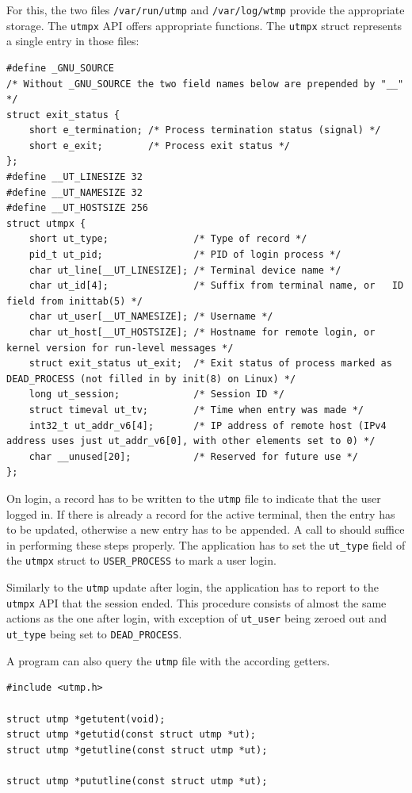 \documentclass[10pt,a4paper,titlepage,twoside,english,final]{zhawreprt}
\begin{document}
For this, the two files \texttt{/var/run/utmp} and \texttt{/var/log/wtmp} provide the appropriate storage. The \texttt{utmpx} \gls{API} offers appropriate functions. The \texttt{utmpx} struct represents a single entry in those files:
\setlistingC
\begin{lstlisting}[caption={Definition of the utmpx structure {\citep[p.819]{KerriskTLPI}}},label=lst:UtmpxDefinition]
#define _GNU_SOURCE
/* Without _GNU_SOURCE the two field names below are prepended by "__" */
struct exit_status {
	short e_termination; /* Process termination status (signal) */
	short e_exit; 		 /* Process exit status */
};
#define __UT_LINESIZE 32
#define __UT_NAMESIZE 32
#define __UT_HOSTSIZE 256
struct utmpx {
	short ut_type; 				 /* Type of record */
	pid_t ut_pid; 				 /* PID of login process */
	char ut_line[__UT_LINESIZE]; /* Terminal device name */
	char ut_id[4]; 				 /* Suffix from terminal name, or	ID field from inittab(5) */
	char ut_user[__UT_NAMESIZE]; /* Username */
	char ut_host[__UT_HOSTSIZE]; /* Hostname for remote login, or kernel version for run-level messages */
	struct exit_status ut_exit;  /* Exit status of process marked as DEAD_PROCESS (not filled in by init(8) on Linux) */
	long ut_session; 			 /* Session ID */
	struct timeval ut_tv; 		 /* Time when entry was made */
	int32_t ut_addr_v6[4]; 		 /* IP address of remote host (IPv4 address uses just ut_addr_v6[0], with other elements set to 0) */
	char __unused[20]; 			 /* Reserved for future use */
};
\end{lstlisting}

On login, a record has to be written to the \texttt{utmp} file to indicate that the user logged in. If there is already a record for the active \gls{terminal}, then the entry has to be updated, otherwise a new entry has to be appended. A call to \cite{pututxline} should suffice in performing these steps properly. The application has to set the \texttt{ut\_type} field of the \texttt{utmpx} struct to \texttt{USER\_PROCESS} to mark a user login.

Similarly to the \texttt{utmp} update after login, the application has to report to the \texttt{utmpx} \gls{API} that the session ended. This procedure consists of almost the same actions as the one after login, with exception of \texttt{ut\_user} being zeroed out and \texttt{ut\_type} being set to \texttt{DEAD\_PROCESS}\citep[p.828]{KerriskTLPI}.

A program can also query the \texttt{utmp} file with the according getters.
\setlistingC
\begin{lstlisting}[caption={\texttt{utmpx} \gls{API} functions},label=lst:UtmpxApiFunctions]
#include <utmp.h>

struct utmp *getutent(void);
struct utmp *getutid(const struct utmp *ut);
struct utmp *getutline(const struct utmp *ut);

struct utmp *pututline(const struct utmp *ut);
\end{lstlisting}
\end{document}
